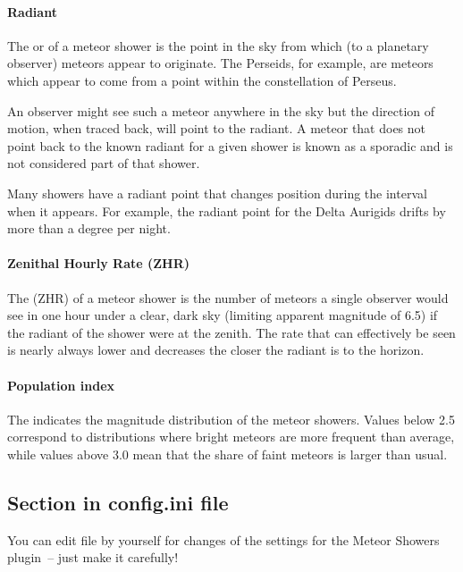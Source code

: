 \paragraph{Radiant}

The  or  of a meteor
shower is the point in the sky from which (to a planetary observer)
meteors appear to originate. The Perseids, for example, are meteors
which appear to come from a point within the constellation of Perseus.

An observer might see such a meteor anywhere in the sky but the
direction of motion, when traced back, will point to the radiant. A
meteor that does not point back to the known radiant for a given
shower is known as a sporadic and is not considered part of that
shower.

Many showers have a radiant point that changes position during the
interval when it appears. For example, the radiant point for the Delta
Aurigids drifts by more than a degree per night.

\paragraph{Zenithal Hourly Rate (ZHR)}

The  (ZHR) of a meteor
shower is the number of meteors a single observer would see in one
hour under a clear, dark sky (limiting apparent magnitude of 6.5) if
the radiant of the shower were at the zenith. The rate that can
effectively be seen is nearly always lower and decreases the closer
the radiant is to the horizon.

\paragraph{Population index}

The  indicates the magnitude distribution
of the meteor showers. Values below 2.5 correspond to
distributions where bright meteors are more frequent than average,
while values above 3.0 mean that the share of faint meteors is larger
than usual.

\subsection{Section  in config.ini file}
\label{sec:plugins:MeteorShowers:config}

You can edit  file by yourself for changes of the
settings for the Meteor Showers plugin~-- just make it carefully!

